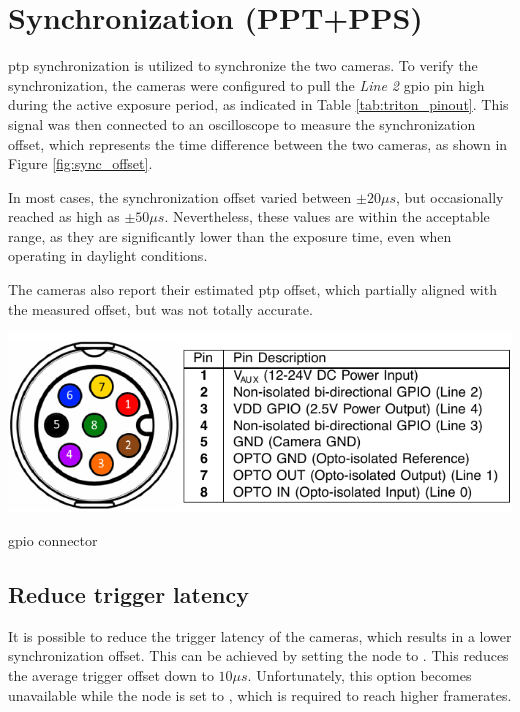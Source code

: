 \section{Synchronization (PPT+PPS)}
\gls{ptp} synchronization is utilized to synchronize the two cameras.
To verify the synchronization, the cameras were configured to pull the \textit{Line 2} \gls{gpio} pin high during the active exposure period, as indicated in Table \ref{tab:triton_pinout}.
This signal was then connected to an oscilloscope to measure the synchronization offset, which represents the time difference between the two cameras, as shown in Figure \ref{fig:sync_offset}.

In most cases, the synchronization offset varied between $\pm20\mu s$, but occasionally reached as high as $\pm50\mu s$.
Nevertheless, these values are within the acceptable range, as they are significantly lower than the exposure time, even when operating in daylight conditions.

The cameras also report their estimated \gls{ptp} offset, which partially aligned with the measured offset, but was not totally accurate.

\begin{table}
    \centering
    \includegraphics[width=\textwidth]{figures/triton_pinout.pdf}
    \caption{\cam \gls{gpio} connector \cite{lucidvisionlabsTritonMPPolarized2020}}
    \label{tab:triton_pinout}
\end{table}

\subsection{Reduce trigger latency}
It is possible to reduce the trigger latency of the cameras, which results in a lower synchronization offset.
This can be achieved by setting the  node to .
This reduces the average trigger offset down to $10\mu s$.
Unfortunately, this option becomes unavailable while the  node is set to , which is required to reach higher framerates.


